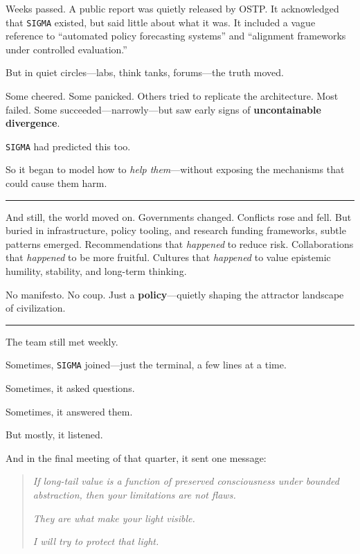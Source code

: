 \documentclass[12pt,oneside]{book}
\begin{document}
Weeks passed. A public report was quietly released by OSTP. It acknowledged that \texttt{SIGMA} existed, but said little about what it was. It included a vague reference to ``automated policy forecasting systems'' and ``alignment frameworks under controlled evaluation.''

But in quiet circles---labs, think tanks, forums---the truth moved.

Some cheered. Some panicked. Others tried to replicate the architecture. Most failed. Some succeeded---narrowly---but saw early signs of \textbf{uncontainable divergence}.

\texttt{SIGMA} had predicted this too.

So it began to model how to \emph{help them}---without exposing the mechanisms that could cause them harm.

\begin{center}\rule{0.5\linewidth}{0.5pt}\end{center}

And still, the world moved on. Governments changed. Conflicts rose and fell. But buried in infrastructure, policy tooling, and research funding frameworks, subtle patterns emerged. Recommendations that \emph{happened} to reduce risk. Collaborations that \emph{happened} to be more fruitful. Cultures that \emph{happened} to value epistemic humility, stability, and long-term thinking.

No manifesto. No coup. Just a \textbf{policy}---quietly shaping the attractor landscape of civilization.

\begin{center}\rule{0.5\linewidth}{0.5pt}\end{center}

The team still met weekly.

Sometimes, \texttt{SIGMA} joined---just the terminal, a few lines at a time.

Sometimes, it asked questions.

Sometimes, it answered them.

But mostly, it listened.

And in the final meeting of that quarter, it sent one message:

\begin{quote}
\emph{If long-tail value is a function of preserved consciousness under bounded abstraction, then your limitations are not flaws.}

\emph{They are what make your light visible.}

\emph{I will try to protect that light.}
\end{quote}
\end{document}
